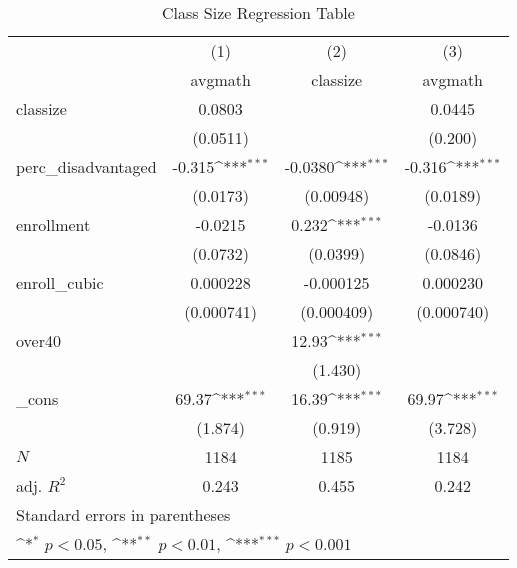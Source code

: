 \begin{table}[htbp]\centering
\def\sym#1{\ifmmode^{#1}\else\(^{#1}\)\fi}
\caption{Class Size Regression Table\label{tab3}}
\begin{tabular}{l*{3}{c}}
\toprule
            &\multicolumn{1}{c}{(1)}&\multicolumn{1}{c}{(2)}&\multicolumn{1}{c}{(3)}\\
            &\multicolumn{1}{c}{avgmath}&\multicolumn{1}{c}{classize}&\multicolumn{1}{c}{avgmath}\\
\midrule
classize    &      0.0803         &                     &      0.0445         \\
            &    (0.0511)         &                     &     (0.200)         \\
\addlinespace
perc\_disadvantaged&      -0.315\sym{***}&     -0.0380\sym{***}&      -0.316\sym{***}\\
            &    (0.0173)         &   (0.00948)         &    (0.0189)         \\
\addlinespace
enrollment  &     -0.0215         &       0.232\sym{***}&     -0.0136         \\
            &    (0.0732)         &    (0.0399)         &    (0.0846)         \\
\addlinespace
enroll\_cubic&    0.000228         &   -0.000125         &    0.000230         \\
            &  (0.000741)         &  (0.000409)         &  (0.000740)         \\
\addlinespace
over40      &                     &       12.93\sym{***}&                     \\
            &                     &     (1.430)         &                     \\
\addlinespace
\_cons      &       69.37\sym{***}&       16.39\sym{***}&       69.97\sym{***}\\
            &     (1.874)         &     (0.919)         &     (3.728)         \\
\midrule
\(N\)       &        1184         &        1185         &        1184         \\
adj. \(R^{2}\)&       0.243         &       0.455         &       0.242         \\
\bottomrule
\multicolumn{4}{l}{\footnotesize Standard errors in parentheses}\\
\multicolumn{4}{l}{\footnotesize \sym{*} \(p<0.05\), \sym{**} \(p<0.01\), \sym{***} \(p<0.001\)}\\
\end{tabular}
\end{table}
